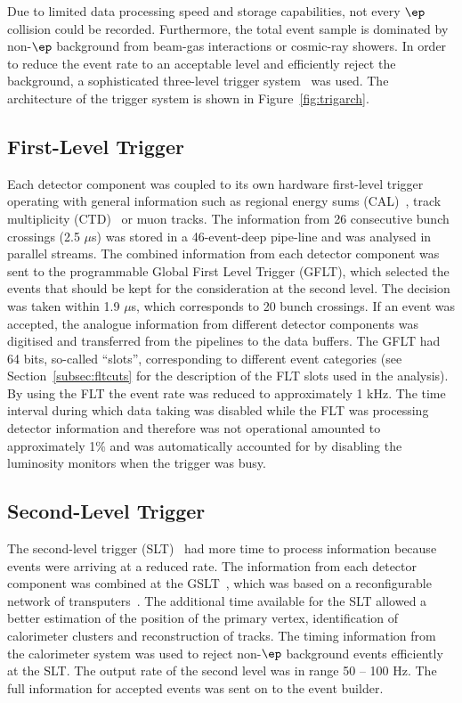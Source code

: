 Due to limited data processing speed and storage capabilities, not every $\ep$ collision could be recorded. Furthermore, the total event sample is dominated by non-$\ep$ background from beam-gas interactions or cosmic-ray showers. In order to reduce the event rate to an acceptable level and efficiently reject the background, a sophisticated three-level trigger system~\cite{Smith:1992im,nim:a379:542,Carlin:1995rv} was used. The architecture of the \zeus trigger system is shown in Figure~\ref{fig:trigarch}. 

\subsection{First-Level Trigger}
\label{subsec:flt} Each detector component was coupled to its own hardware first-level trigger operating with general information such as regional energy sums (CAL)~\cite{nim:a355:278}, track multiplicity (CTD)~\cite{nim:a315:431} or muon tracks. The information from 26 consecutive bunch crossings (2.5 $\mu$s) was stored in a 46-event-deep pipe-line and was analysed in parallel streams. The combined information from each detector component was sent to the programmable Global First Level Trigger (GFLT), which selected the events that should be kept for the consideration at the second level. The decision was taken within 1.9 $\mu$s, which corresponds to 20 bunch crossings. If an event was accepted, the analogue information from different detector components was digitised and transferred from the pipelines to the data buffers. The GFLT had 64 bits, so-called ``slots'', corresponding to different event categories (see Section~\ref{subsec:fltcuts} for the description of the FLT slots used in the analysis). By using the FLT the event rate was reduced to approximately 1 kHz. The time interval during which data taking was disabled while the FLT was processing detector information and therefore was not operational amounted to approximately 1\% and was automatically accounted for by disabling the luminosity monitors when the trigger was busy.

\subsection{Second-Level Trigger}
\label{subsec:slt}
The second-level trigger (SLT)~\cite{Allfrey:2007zz} had more time to process information because events were arriving at a reduced rate. The information from each detector component was combined at the GSLT~\cite{upub:abbiendi:zn99063,upub:chlebana:zn94102,Uijterwaal:1992xc}, which was based on a reconfigurable network of transputers~\cite{npps:b32:181}. The additional time available for the SLT allowed a better estimation of the position of the primary vertex, identification of  calorimeter clusters and reconstruction of tracks. The timing information from the calorimeter system was used to reject non-$\ep$ background events efficiently at the SLT. The output rate of the second level was in range 50 -- 100 Hz. The full information for accepted events was sent on to the event builder.

